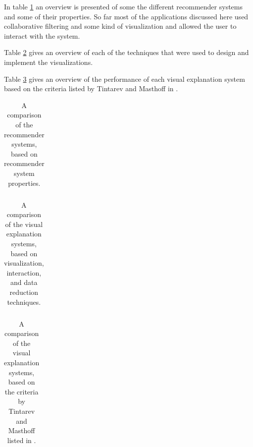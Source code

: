 In table \ref{table:comparison:properties} an overview is presented of some the different recommender systems and some of their properties. So far most of the applications discussed here used collaborative filtering and some kind of visualization and allowed the user to interact with the system.

Table \ref{table:comparison:techniques} gives an overview of each of the techniques that were used to design and implement the visualizations.

Table \ref{table:comparison:criteria} gives an overview of the performance of each visual explanation system based on the criteria listed by Tintarev and Masthoff in \cite{tintarev:2007:SER:1547550.1547664}.

\begin{center}
	\begin{table}%
		\begin{tabular}{lcr}
			
		\end{tabular}
		\caption{A comparison of the recommender systems, based on recommender system properties.}
		\label{table:comparison:properties}
	\end{table}
\end{center}



\begin{center}
	\begin{table}%
		\begin{tabular}{lcr}
			
		\end{tabular}
		\caption{A comparison of the visual explanation systems, based on visualization, interaction, and data reduction techniques.}
		\label{table:comparison:techniques}
	\end{table}
\end{center}


\begin{center}
	\begin{table}%
		\begin{tabular}{lcr}
			
		\end{tabular}
		\caption{A comparison of the visual explanation systems, based on the criteria by Tintarev and Masthoff listed in \cite{tintarev:2007:SER:1547550.1547664}.}
		\label{table:comparison:criteria}
	\end{table}
\end{center}



